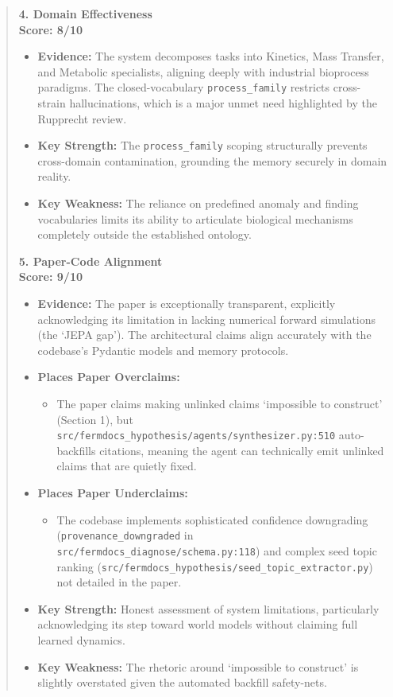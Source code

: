 \documentclass[11pt]{article}
\begin{document}
\begin{quote}
\textbf{4. Domain Effectiveness} \\
\textbf{Score: 8/10}
\begin{itemize}[leftmargin=*,noitemsep]
\item \textbf{Evidence:} The system decomposes tasks into Kinetics, Mass Transfer, and Metabolic specialists, aligning deeply with industrial bioprocess paradigms. The closed-vocabulary \texttt{process\_family} restricts cross-strain hallucinations, which is a major unmet need highlighted by the Rupprecht review.
\item \textbf{Key Strength:} The \texttt{process\_family} scoping structurally prevents cross-domain contamination, grounding the memory securely in domain reality.
\item \textbf{Key Weakness:} The reliance on predefined anomaly and finding vocabularies limits its ability to articulate biological mechanisms completely outside the established ontology.
\end{itemize}

\textbf{5. Paper-Code Alignment} \\
\textbf{Score: 9/10}
\begin{itemize}[leftmargin=*,noitemsep]
\item \textbf{Evidence:} The paper is exceptionally transparent, explicitly acknowledging its limitation in lacking numerical forward simulations (the `JEPA gap'). The architectural claims align accurately with the codebase's Pydantic models and memory protocols.
\item \textbf{Places Paper Overclaims:}
  \begin{itemize}[leftmargin=*,noitemsep]
  \item The paper claims making unlinked claims `impossible to construct' (Section 1), but \texttt{src/fermdocs\_hypothesis/agents/synthesizer.py:510} auto-backfills citations, meaning the agent can technically emit unlinked claims that are quietly fixed.
  \end{itemize}
\item \textbf{Places Paper Underclaims:}
  \begin{itemize}[leftmargin=*,noitemsep]
  \item The codebase implements sophisticated confidence downgrading (\texttt{provenance\_downgraded} in \texttt{src/fermdocs\_diagnose/schema.py:118}) and complex seed topic ranking (\texttt{src/fermdocs\_hypothesis/seed\_topic\_extractor.py}) not detailed in the paper.
  \end{itemize}
\item \textbf{Key Strength:} Honest assessment of system limitations, particularly acknowledging its step toward world models without claiming full learned dynamics.
\item \textbf{Key Weakness:} The rhetoric around `impossible to construct' is slightly overstated given the automated backfill safety-nets.
\end{itemize}
\end{quote}
\end{document}
